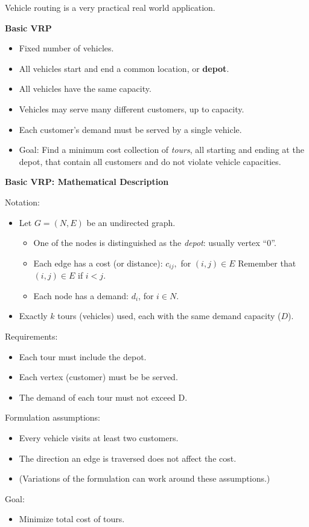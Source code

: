 \documentclass[11pt]{article}
\theoremstyle{definition}
\begin{document}
\bigskip
\begin{tcolorbox}
Vehicle routing is a very practical real world application.
\end{tcolorbox}



\newpage

\textbf{Basic VRP}
\begin{itemize}
	\item Fixed number of vehicles.
	\item All vehicles start and end a common location, or \textbf{depot}.
	\item All vehicles have the same capacity.  
	\item Vehicles may serve many different customers, up to capacity.
	\item Each customer's demand must be served by a single vehicle.
	\item Goal:  Find a minimum cost collection of \emph{tours}, all starting and ending at the depot, that contain all customers and do not violate vehicle capacities.
\end{itemize}




\begin{tcolorbox}
\textbf{Basic VRP:  Mathematical Description}

Notation: 
\begin{itemize}
	\item Let $G = (N,E)$ be an undirected graph.  
		\begin{itemize}
			\item One of the nodes is distinguished as the \emph{depot}: usually vertex ``$0$''.
			\item Each edge has a cost (or distance): $c_{ij},$ for $(i,j) \in E$ Remember that $(i,j) \in E$ if $i < j$.
			\item Each node has a demand: $d_i$, for $i \in N$.
		\end{itemize}
	\item  Exactly $k$ tours (vehicles) used, each with the same demand capacity ($D$).
\end{itemize}

Requirements:
\begin{itemize}
	\item Each tour must include the depot.
	\item Each vertex (customer) must be be served.
	\item The demand of each tour must not exceed D.
\end{itemize}

Formulation assumptions:
\begin{itemize}
	\item Every vehicle visits at least two customers.
	\item The direction an edge is traversed does not affect the cost.
	\item (Variations of the formulation can work around these assumptions.)
\end{itemize}
Goal:
\begin{itemize}
	\item  Minimize total cost of tours.
\end{itemize}
\end{tcolorbox}
\end{document}
